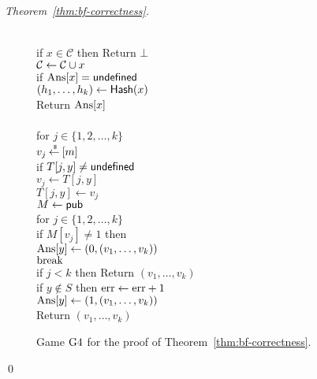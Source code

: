 \begin{proof}[Theorem~\ref{thm:bf-correctness}]
\begin{figure}[tp]
{{\\
if $x \in \mathcal{C}$ then Return $\bot$\\
${\cal C} \gets {\cal C} \cup x$\\
if $\mathrm{Ans}[x] = \mathsf{undefined}$\\
\nudge $(h_1, \ldots, h_{k}) \gets \mathsf{Hash}(x)$\\
Return $\mathrm{Ans}[x]$\\
%
}
{
\\
for $j \in \{1,2,\ldots,k\}$\\
\nudge $v_j {\:\stackrel{{\scriptscriptstyle \hspace{0.2em}\$}} {\leftarrow}\:} [m]$\\
\nudge if $T[j,y] \neq \mathsf{undefined}$\\
\nudge \nudge $v_j \gets T[j,y]$\\
\nudge $T[j,y] \gets v_j$\\
%
$M \gets{\sf pub}$\\
for $j \in \{1,2,\ldots,k\}$\\
\nudge if $M[v_j] \neq 1$ then \\
\nudge \nudge $\mathrm{Ans}[y] \gets (0, (v_1, \ldots, v_{k}) )$\\
\nudge \nudge $\mathrm{break}$\\
if $j < k$ then Return $\left(v_1,\ldots,v_k\right)$\\
if $y \not\in S$ then $\mathrm{err} \gets \mathrm{err} +1$\\
$\mathrm{Ans}[y] \gets (1, (v_1, \ldots, v_{k}))$\\
Return $\left(v_1,\ldots,v_k\right)$
}
}
\caption{Game $\text{G4}$ for the
proof of Theorem~\ref{thm:bf-correctness}.}
\label{fig:bf-correctness-games2}
\end{figure}
\hfill\qed
\end{proof}
